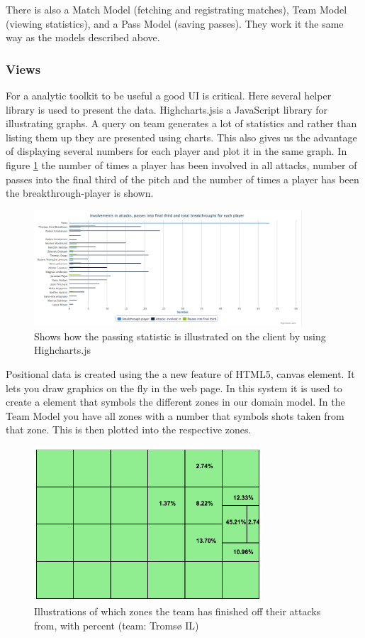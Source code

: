 There is also a Match Model (fetching and registrating matches), Team Model (viewing statistics), and a Pass Model (saving passes). They work it the same way as the models described above.


\subsubsection{Views}

For a analytic toolkit to be useful a good UI is critical. Here several helper library is used to present the data. Highcharts.js\footnotemark  is a JavaScript library for illustrating graphs. A query on team generates a lot of statistics and rather than listing them up they are presented using charts. This also gives us the advantage of displaying several numbers for each player and plot it in the same graph. In figure \ref{fig:chart} the number of times a player has been involved in all attacks, number of passes into the final third of the pitch and the number of times a player has been the breakthrough-player is shown.


\begin{figure}[ht!]
\centering
\includegraphics[width=100mm]{images/general/chart_passes.png}
\caption{Shows how the passing statistic is illustrated on the client by using Highcharts.js}
\label{fig:chart}
\end{figure}

Positional data is created using the a new feature of HTML5, canvas element. It lets you draw graphics on the fly in the web page. In this system it is used to create a element that symbols the different zones in our domain model. In the Team Model you have all zones with a number that symbols shots taken from that zone. This is then plotted into the respective zones.

\begin{figure}[ht!]
\centering
\includegraphics[width=85mm]{images/general/finishing_zones.png}
\caption{Illustrations of which zones the team has finished off their attacks from, with percent (team: Tromsø IL)}
\label{overflow}
\end{figure}

